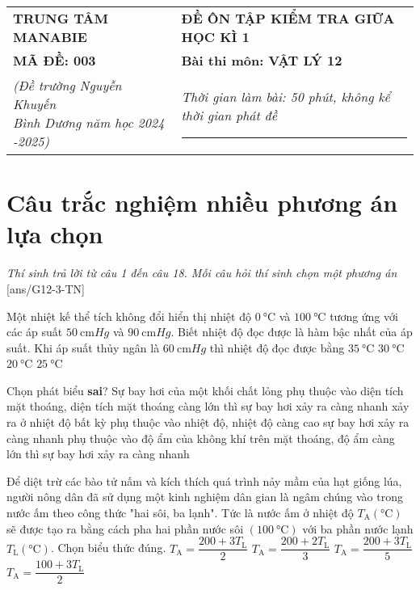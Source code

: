 \begin{tabular}{M{6.5cm}M{11cm}}
	\textbf{TRUNG TÂM MANABIE}& \textbf{ĐỀ ÔN TẬP KIỂM TRA GIỮA HỌC KÌ 1}\\
	\textbf{MÃ ĐỀ: 003}& \textbf{Bài thi môn: VẬT LÝ 12}\\
	\textit{(Đề trường Nguyễn Khuyến \newline Bình Dương năm học 2024 -2025)}& \textit{Thời gian làm bài: 50 phút, không kể thời gian phát đề}
	
	\noindent\rule{4cm}{0.8pt} \\
\end{tabular}
\setcounter{section}{0}
\section{Câu trắc nghiệm nhiều phương án lựa chọn}
\textit{Thí sinh trả lời từ câu 1 đến câu 18. Mỗi câu hỏi thí sinh chọn một phương án}
\setcounter{ex}{0}
[ans/G12-3-TN]
\begin{ex}
	Một nhiệt kế thể tích không đổi hiển thị nhiệt độ $\SI{0}{\celsius}$ và $\SI{100}{\celsius}$ tương ứng với các áp suất $\SI{50}{\centi\meter Hg}$ và $\SI{90}{\centi\meter Hg}$. Biết nhiệt độ đọc được là hàm bậc nhất của áp suất. Khi áp suất thủy ngân là $\SI{60}{\centi\meter Hg}$ thì nhiệt độ đọc được bằng
	\choice
	{$\SI{35}{\celsius}$}
	{$\SI{30}{\celsius}$}
	{$\SI{20}{\celsius}$}
	{$\SI{25}{\celsius}$}
\end{ex}
\begin{ex}
	Chọn phát biểu \textbf{sai}? Sự bay hơi của một khối chất lỏng
	\choice
	{phụ thuộc vào diện tích mặt thoáng, diện tích mặt thoáng càng lớn thì sự bay hơi xảy ra càng nhanh}
	{xảy ra ở nhiệt độ bất kỳ}
	{phụ thuộc vào nhiệt độ, nhiệt độ càng cao sự bay hơi xảy ra càng nhanh}
	{\True phụ thuộc vào độ ẩm của không khí trên mặt thoáng, độ ẩm càng lớn thì sự bay hơi xảy ra càng nhanh}
\end{ex}
\begin{ex}
	Để diệt trừ các bào tử nấm và kích thích quá trình nảy mầm của hạt giống lúa, người nông dân đã sử dụng một kinh nghiệm dân gian là ngâm chúng vào trong nước ấm theo công thức "hai sôi, ba lạnh". Tức là nước ấm ở nhiệt độ $T_{\mathrm{A}}\left(\si{\celsius}\right)$ sẽ được tạo ra bằng cách pha hai phần nước sôi $\left(\SI{100}{\celsius}\right)$ với ba phần nước lạnh $T_{\mathrm{L}}\left(\si{\celsius}\right)$. Chọn biểu thức đúng.
	\choice
	{$T_{\mathrm{A}}=\dfrac{200+3 T_{\mathrm{L}}}{2}$}
	{$T_{\mathrm{A}}=\dfrac{200+2 T_{\mathrm{L}}}{3}$}
	{\True $T_{\mathrm{A}}=\dfrac{200+3 T_{\mathrm{L}}}{5}$}
	{$T_{\mathrm{A}}=\dfrac{100+3 T_{\mathrm{L}}}{2}$}
\end{ex}
